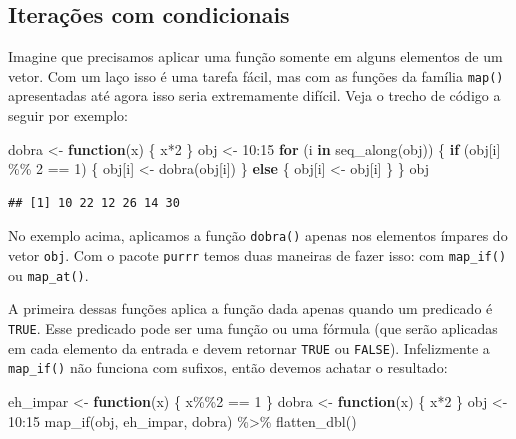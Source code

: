 \documentclass[
]{book}
\newenvironment{Shaded}{\begin{snugshade}}{\end{snugshade}}
\newcommand{\ControlFlowTok}[1]{\textcolor[rgb]{0.13,0.29,0.53}{\textbf{#1}}}
\newcommand{\DecValTok}[1]{\textcolor[rgb]{0.00,0.00,0.81}{#1}}
\newcommand{\FunctionTok}[1]{\textcolor[rgb]{0.00,0.00,0.00}{#1}}
\newcommand{\NormalTok}[1]{#1}
\newcommand{\OtherTok}[1]{\textcolor[rgb]{0.56,0.35,0.01}{#1}}
\newcommand{\SpecialCharTok}[1]{\textcolor[rgb]{0.00,0.00,0.00}{#1}}
\begin{document}
\hypertarget{iterauxe7uxf5es-com-condicionais}{%
\subsection{Iterações com condicionais}\label{iterauxe7uxf5es-com-condicionais}}

Imagine que precisamos aplicar uma função somente em alguns elementos de um vetor.
Com um laço isso é uma tarefa fácil, mas com as funções da família \texttt{map()}
apresentadas até agora isso seria extremamente difícil. Veja o trecho de código
a seguir por exemplo:

\begin{Shaded}
\begin{Highlighting}[]
\NormalTok{dobra }\OtherTok{\textless{}{-}} \ControlFlowTok{function}\NormalTok{(x) \{ x}\SpecialCharTok{*}\DecValTok{2}\NormalTok{ \}}
\NormalTok{obj }\OtherTok{\textless{}{-}} \DecValTok{10}\SpecialCharTok{:}\DecValTok{15}
\ControlFlowTok{for}\NormalTok{ (i }\ControlFlowTok{in} \FunctionTok{seq\_along}\NormalTok{(obj)) \{}
  \ControlFlowTok{if}\NormalTok{ (obj[i] }\SpecialCharTok{\%\%} \DecValTok{2} \SpecialCharTok{==} \DecValTok{1}\NormalTok{) \{ obj[i] }\OtherTok{\textless{}{-}} \FunctionTok{dobra}\NormalTok{(obj[i]) \}}
  \ControlFlowTok{else}\NormalTok{                  \{ obj[i] }\OtherTok{\textless{}{-}}\NormalTok{ obj[i] \}}
\NormalTok{\}}
\NormalTok{obj}
\end{Highlighting}
\end{Shaded}

\begin{verbatim}
## [1] 10 22 12 26 14 30
\end{verbatim}

No exemplo acima, aplicamos a função \texttt{dobra()} apenas nos elementos ímpares do
vetor \texttt{obj}. Com o pacote \texttt{purrr} temos duas maneiras de fazer isso: com
\texttt{map\_if()} ou \texttt{map\_at()}.

A primeira dessas funções aplica a função dada apenas quando um predicado é
\texttt{TRUE}. Esse predicado pode ser uma função ou uma fórmula (que serão aplicadas
em cada elemento da entrada e devem retornar \texttt{TRUE} ou \texttt{FALSE}). Infelizmente
a \texttt{map\_if()} não funciona com sufixos, então devemos achatar o resultado:

\begin{Shaded}
\begin{Highlighting}[]
\NormalTok{eh\_impar }\OtherTok{\textless{}{-}} \ControlFlowTok{function}\NormalTok{(x) \{ x}\SpecialCharTok{\%\%}\DecValTok{2} \SpecialCharTok{==} \DecValTok{1}\NormalTok{ \}}
\NormalTok{dobra }\OtherTok{\textless{}{-}} \ControlFlowTok{function}\NormalTok{(x) \{ x}\SpecialCharTok{*}\DecValTok{2}\NormalTok{ \}}
\NormalTok{obj }\OtherTok{\textless{}{-}} \DecValTok{10}\SpecialCharTok{:}\DecValTok{15}
\FunctionTok{map\_if}\NormalTok{(obj, eh\_impar, dobra) }\SpecialCharTok{\%\textgreater{}\%} \FunctionTok{flatten\_dbl}\NormalTok{()}
\end{Highlighting}
\end{Shaded}
\end{document}
